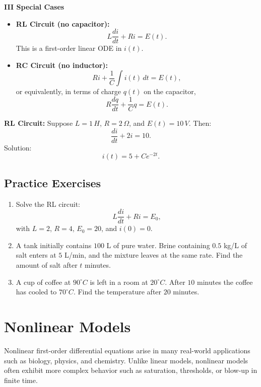   \textbf{III Special Cases}
  \begin{itemize}
      \item \textbf{RL Circuit (no capacitor):}
      \[
      L \frac{di}{dt} + Ri = E(t).
      \]
      This is a first-order linear ODE in $i(t)$.
      \item \textbf{RC Circuit (no inductor):}
      \[
      R i + \frac{1}{C} \int i(t)\,dt = E(t),
      \]
      or equivalently, in terms of charge $q(t)$ on the capacitor,
      \[
      R \frac{dq}{dt} + \frac{1}{C}q = E(t).
      \]
  \end{itemize}

  \begin{example}
    \textbf{RL Circuit:}
    Suppose $L=1 \, H$, $R=2 \, \Omega$, and $E(t)=10 \, V$. Then:
    \[
    \frac{di}{dt} + 2i = 10.
    \]
    Solution:
    \[
    i(t) = 5 + Ce^{-2t}.
    \]
  \end{example}


\subsection*{Practice Exercises}
\begin{enumerate}
    \item Solve the RL circuit:
    \[
    L\frac{di}{dt} + Ri = E_0,
    \]
    with $L=2$, $R=4$, $E_0=20$, and $i(0)=0$.

    \item A tank initially contains $100$ L of pure water. Brine containing $0.5$ kg/L of salt enters at $5$ L/min, and the mixture leaves at the same rate. Find the amount of salt after $t$ minutes.

    \item A cup of coffee at $90^\circ C$ is left in a room at $20^\circ C$. After $10$ minutes the coffee has cooled to $70^\circ C$. Find the temperature after $20$ minutes.
\end{enumerate}









\section{Nonlinear Models}
  Nonlinear first-order differential equations arise in many real-world applications such as biology, physics, and chemistry. Unlike linear models, nonlinear models often exhibit more complex behavior such as saturation, thresholds, or blow-up in finite time. 


